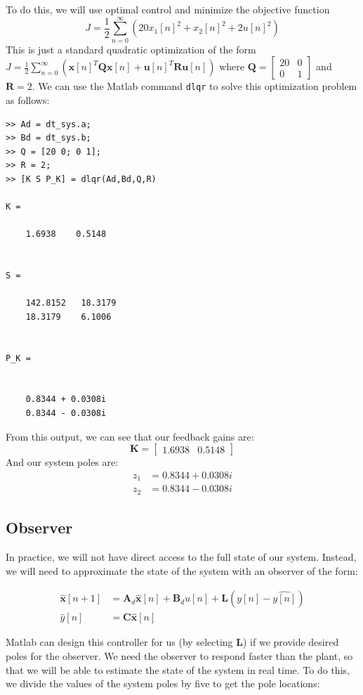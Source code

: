 \documentclass[11pt]{article}
\begin{document}
To do this, we will use optimal control and minimize the objective function 
\[
J = \frac{1}{2}\sum_{n=0}^{\infty}\left(20x_1[n]^2 + x_2[n]^2 +2u[n]^2 \right) 
\]
This is just a standard quadratic optimization of the form $J = \frac{1}{2}\sum\limits_{n=0}^{\infty}\left(\mathbf{x}[n]^T\mathbf{Qx}[n] + \mathbf{u}[n]^T\mathbf{Ru}[n] \right) $ where $\mathbf{Q} = \begin{bmatrix}20 & 0\\0 & 1\end{bmatrix}$ and $\mathbf{R} = 2$. 
We can use the Matlab command {\tt dlqr} to solve this optimization problem as follows:
\small
\begin{verbatim}
>> Ad = dt_sys.a;
>> Bd = dt_sys.b;
>> Q = [20 0; 0 1];
>> R = 2;
>> [K S P_K] = dlqr(Ad,Bd,Q,R)

K =

    1.6938    0.5148


S =

    142.8152   18.3179
    18.3179    6.1006


P_K =


    0.8344 + 0.0308i
    0.8344 - 0.0308i
\end{verbatim}\normalsize

From this output, we can see that our feedback gains are:
\[\mathbf{K} = \begin{bmatrix} 1.6938 & 0.5148\end{bmatrix}\]
And our system poles are:
\begin{align*}
z_1 &= 0.8344 + 0.0308i \\ z_2 &= 0.8344 - 0.0308i
\end{align*}

\subsection*{Observer}
In practice, we will not have direct access to the full state of our system.
Instead, we will need to approximate the state of the system with an observer of the form:

\begin{align*}
\hat{\mathbf{x}}[n+1] &= \mathbf{A}_d\hat{\mathbf{x}}[n]+ \mathbf{B}_d u[n] + \mathbf{L}(y[n]-\hat{y[n]} )\\
\hat{y}[n] &= \mathbf{C}\hat{\mathbf{x}}[n]
\end{align*}

Matlab can design this controller for us (by selecting {\bf L}) if we provide desired poles for the observer.
We need the observer to respond faster than the plant, so that we will be able to estimate the state of the system in real time.
To do this, we divide the values of the system poles by five to get the pole locations:
\end{document}
